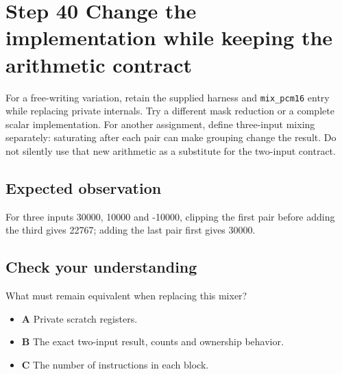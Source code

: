 \section{Step 40 Change the implementation while keeping the arithmetic contract}\label{pcm-s40}

For a free-writing variation, retain the supplied harness and \texttt{mix\_pcm16} entry while replacing private internals. Try a different mask reduction or a complete scalar implementation. For another assignment, define three-input mixing separately: saturating after each pair can make grouping change the result. Do not silently use that new arithmetic as a substitute for the two-input contract.

\subsection{Expected observation}
For three inputs 30000, 10000 and -10000, clipping the first pair before adding the third gives 22767; adding the last pair first gives 30000.

\subsection{Check your understanding}
What must remain equivalent when replacing this mixer?

\begin{itemize}
\item \textbf{A} Private scratch registers.
\item \textbf{B} The exact two-input result, counts and ownership behavior.
\item \textbf{C} The number of instructions in each block.
\end{itemize}
